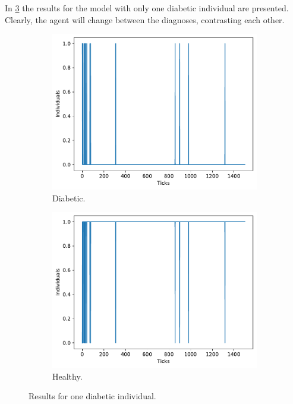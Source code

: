 	In \cref{fig:one} the results for the model with only one diabetic individual are presented. Clearly, the agent will change between the diagnoses, contrasting each other.
	\begin{figure}[H]
        \centering
        \begin{subfigure}[b]{0.3\columnwidth}
            \centering
            \includegraphics[width=1\columnwidth]{files/diabetes-1-diabetes.pdf}
            \caption{Diabetic.}
            \label{subfig:control}
        \end{subfigure} 
        \begin{subfigure}[b]{0.3\columnwidth}
            \centering 
            \includegraphics[width=1\columnwidth]{files/diabetes-1-healthy.pdf}
            \caption{Healthy.}
            \label{subfig:sol}
        \end{subfigure}
        \caption{Results for one diabetic individual.}
        \label{fig:one}
	\end{figure}
